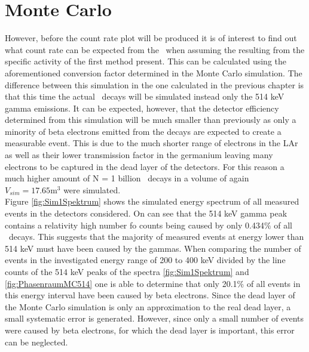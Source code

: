 \section{Monte Carlo}

However, before the count rate plot will be produced it is of interest to find out what count rate can be expected from the \Kr\ when assuming the resulting from the specific activity of the first method present.
This can be calculated using the aforementioned conversion factor determined in the Monte Carlo simulation.
The difference between this simulation in the one calculated in the previous chapter is that this time the actual \Kr\ decays will be simulated instead only the 514 keV gamma emissions.
It can be expected, however, that the detector efficiency determined from this simulation will be much smaller than previously as only a minority of beta electrons emitted from the decays are expected to create a measurable event.
This is due to the much shorter range of electrons in the LAr as well as their lower transmission factor in the germanium leaving many electrons to be captured in the dead layer of the detectors.
For this reason a much higher amount of N = 1 billion \Kr\ decays in a volume of again $V_{sim} = 17.65 \mathrm{m}^3$ were simulated.
\\

Figure \ref{fig:Sim1Spektrum} shows the simulated energy spectrum of all measured events in the detectors considered.
On can see that the 514 keV gamma peak contains a relativity high number fo counts being caused by only 0.434$\%$ of all \Kr\ decays.
This suggests that the majority of measured events at energy lower than 514 keV must have been caused by the gammas.
When comparing the number of events in the investigated energy range of 200 to 400 keV divided by the line counts of the 514 keV peaks of the spectra \ref{fig:Sim1Spektrum} and \ref{fig:PhasenraumMC514} one is able to determine that only 20.1$\%$ of all events in this energy interval have been caused by beta electrons.
Since the dead layer of the Monte Carlo simulation is only an approximation to the real dead layer, a small systematic error is generated. 
However, since only a small number of events were caused by beta electrons, for which the dead layer is important, this error can be neglected. 
\\


